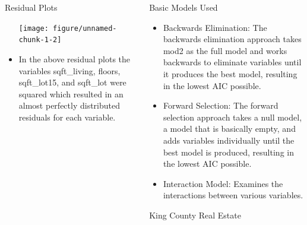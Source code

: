 \documentclass[final]{beamer}\usepackage[]{graphicx}\usepackage[]{color}
\makeatletter
\newenvironment{kframe}{%
 \def\at@end@of@kframe{}%
 \ifinner\ifhmode%
  \def\at@end@of@kframe{\end{minipage}}%
  \begin{minipage}{\columnwidth}%
 \fi\fi%
 \def\FrameCommand##1{\hskip\@totalleftmargin \hskip-\fboxsep
 \colorbox{shadecolor}{##1}\hskip-\fboxsep
     \hskip-\linewidth \hskip-\@totalleftmargin \hskip\columnwidth}%
 \MakeFramed {\advance\hsize-\width
   \@totalleftmargin\z@ \linewidth\hsize
   \@setminipage}}%
 {\par\unskip\endMakeFramed%
 \at@end@of@kframe}
\newenvironment{knitrout}{}{} %
\makeatother
\begin{document}
\begin{frame}[fragile]
\begin{columns}[t]
\begin{column}{0.31\linewidth}
\begin{minipage}[t][.955\textheight]{\linewidth}
\begin{block}{Residual Plots}
\begin{itemize}
\begin{knitrout}
{}




{\centering \texttt{[image: figure/unnamed-chunk-1-2]} 

}



\end{knitrout}
\vspace{2ex}
\item In the above residual plots the variables sqft\_living, floors, sqft\_lot15, and sqft\_lot were squared which resulted in an almost perfectly distributed residuals for each variable. 
\end{itemize}
\vspace{0ex}
\vfill
\end{block}
\vfill

\end{minipage}
\end{column}%


\begin{column}{0.31\linewidth}
\begin{minipage}[t][.955\textheight]{\linewidth} 

\vspace{0ex}
\begin{block}{Basic Models Used}
\begin{itemize}
\item Backwards Elimination: The backwards elimination approach takes mod2 as the full model and works backwards to eliminate variables until it produces the best model, resulting in the lowest AIC possible.  
\item Forward Selection: The forward selection approach takes a null model, a model that is basically empty, and adds variables individually until the best model is produced, resulting in the lowest AIC possible.   
\item Interaction Model: Examines the interactions between various variables.
\end{itemize}
\vspace{0ex}
\end{block}
\vfill

\vspace{0ex}
\begin{block}{King County Real Estate}
\vspace{0ex}
\begin{knitrout}
\color{fgcolor}\begin{kframe}



\end{kframe}
\end{knitrout}
\end{block}
\end{minipage}
\end{column}
\end{columns}
\end{frame}
\end{document}
